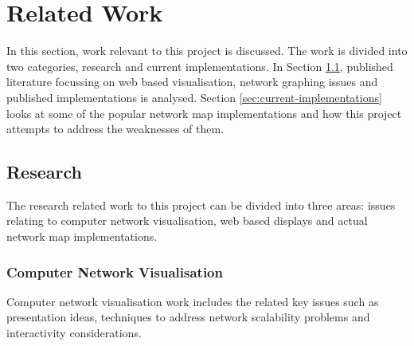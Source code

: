 \documentclass[11pt, a4paper]{article}
\begin{document}
\newpage

\section{Related Work}
\label{sec:related-work}

In this section, work relevant to this project is discussed. The work is divided
into two categories, research and current implementations. In Section
\ref{sec:research}, published literature focussing on web based visualisation,
network graphing issues and published implementations is analysed. Section
\ref{sec:current-implementations} looks at some of the popular network map
implementations and how this project attempts to address the weaknesses of them.

\subsection{Research}
\label{sec:research}

The research related work to this project can be divided into three areas:
issues relating to computer network visualisation, web based displays and actual
network map implementations. 

\subsubsection{Computer Network Visualisation}
\label{sec:computer-network-vis}

Computer network visualisation work includes the related key issues such as
presentation ideas, techniques to address network scalability problems and
interactivity considerations.
\end{document}
